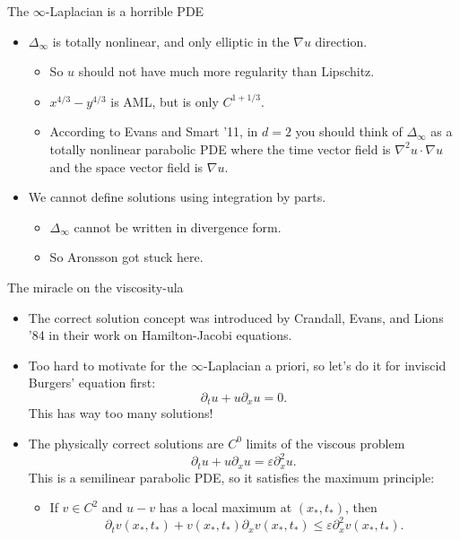 \documentclass[10pt]{beamer}
\begin{document}
\begin{frame}{The $\infty$-Laplacian is a horrible PDE}
\begin{itemize}
\item $\Delta_\infty$ is totally nonlinear, and only elliptic in the $\nabla u$ direction.  
\begin{itemize}
\item So $u$ should not have much more regularity than Lipschitz. 
\item $x^{4/3} - y^{4/3}$ is AML, but is only $C^{1 + 1/3}$. 
\item According to Evans and Smart '11, in $d = 2$ you should think of $\Delta_\infty$ as a totally nonlinear parabolic PDE where the time vector field is $\nabla^2 u \cdot \nabla u$ and the space vector field is $\nabla u$. 
\end{itemize}
\item We cannot define solutions using integration by parts. 
\begin{itemize}
\item $\Delta_\infty$ cannot be written in divergence form. 
\item So Aronsson got stuck here.
\end{itemize}
\end{itemize}
\end{frame}

\begin{frame}{The miracle on the viscosity-ula}
\begin{itemize}
\item The correct solution concept was introduced by Crandall, Evans, and Lions '84 in their work on Hamilton-Jacobi equations. 
\item Too hard to motivate for the $\infty$-Laplacian a priori, so let's do it for inviscid Burgers' equation first:
$$\partial_t u + u \partial_x u = 0.$$
This has way too many solutions!  
\item The physically correct solutions are $C^0$ limits of the viscous problem 
$$\partial_t u + u \partial_x u = \varepsilon \partial_x^2 u.$$
This is a semilinear parabolic PDE, so it satisfies the maximum principle: 
\begin{itemize}
\item If $v \in C^2$ and $u - v$ has a local maximum at $(x_*, t_*)$, then
$$\partial_t v(x_*, t_*) + v(x_*, t_*) \partial_x v(x_*, t_*) \leq \varepsilon \partial_x^2 v(x_*, t_*).$$
\end{itemize}
\end{itemize}
\end{frame}
\end{document}
